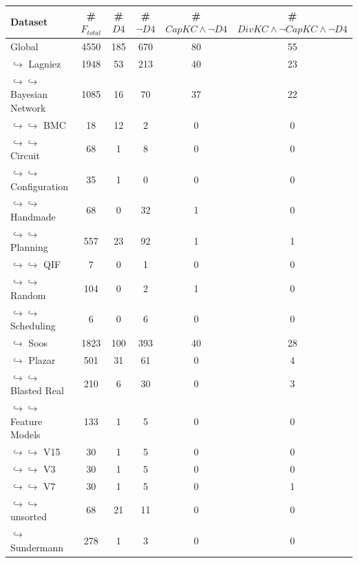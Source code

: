 \documentclass{article}
\newcommand\dfour[0]{D4\xspace}
\newcommand\divkc[0]{DivKC\xspace}
\newcommand\capkc[0]{CapKC\xspace}
\begin{document}
    
\begin{table}[h!]
        \centering
        \begin{tabular}{l|c|c|c|c|c}
            Dataset & \#$F_\textit{total}$ & \#$\textit{\dfour}$ & \#$\neg \textit{\dfour}$ & \#$\textit{\capkc} \land \neg \textit{\dfour}$ & \#$\textit{\divkc} \land \neg \textit{\capkc} \land \neg \textit{\dfour}$ \\ 
            \hline
Global & 4550 & 185 & 670 & 80 & 55 \\
$\hookrightarrow$ Lagniez \cite{D4} & 1948 & 53 & 213 & 40 & 23 \\
$\hookrightarrow \hookrightarrow$ Bayesian Network & 1085 & 16 & 70 & 37 & 22 \\
$\hookrightarrow \hookrightarrow$ BMC & 18 & 12 & 2 & 0 & 0 \\
$\hookrightarrow \hookrightarrow$ Circuit & 68 & 1 & 8 & 0 & 0 \\
$\hookrightarrow \hookrightarrow$ Configuration & 35 & 1 & 0 & 0 & 0 \\
$\hookrightarrow \hookrightarrow$ Handmade & 68 & 0 & 32 & 1 & 0 \\
$\hookrightarrow \hookrightarrow$ Planning & 557 & 23 & 92 & 1 & 1 \\
$\hookrightarrow \hookrightarrow$ QIF & 7 & 0 & 1 & 0 & 0 \\
$\hookrightarrow \hookrightarrow$ Random & 104 & 0 & 2 & 1 & 0 \\
$\hookrightarrow \hookrightarrow$ Scheduling & 6 & 0 & 6 & 0 & 0 \\
$\hookrightarrow$ Soos \cite{soos_2024_10449477} & 1823 & 100 & 393 & 40 & 28 \\
$\hookrightarrow$ Plazar \cite{Plazar2019} & 501 & 31 & 61 & 0 & 4 \\
$\hookrightarrow \hookrightarrow$ Blasted Real & 210 & 6 & 30 & 0 & 3 \\
$\hookrightarrow \hookrightarrow$ Feature Models & 133 & 1 & 5 & 0 & 0 \\
$\hookrightarrow \hookrightarrow$ V15 & 30 & 1 & 5 & 0 & 0 \\
$\hookrightarrow \hookrightarrow$ V3 & 30 & 1 & 5 & 0 & 0 \\
$\hookrightarrow \hookrightarrow$ V7 & 30 & 1 & 5 & 0 & 1 \\
$\hookrightarrow \hookrightarrow$ unsorted & 68 & 21 & 11 & 0 & 0 \\
$\hookrightarrow$ Sundermann \cite{SBK+:SPLC24} & 278 & 1 & 3 & 0 & 0 \\
    \end{tabular}

\end{table}
\end{document}
